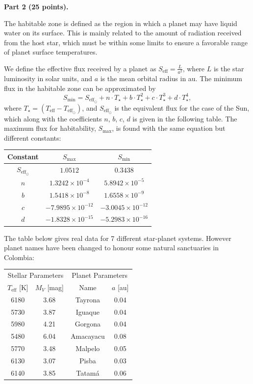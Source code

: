 \medskip
\noindent\textbf{Part 2 (25 points).}

The habitable zone is defined as the region in which a planet may have liquid
water on its surface. This is mainly related to the amount of radiation
received from the host star, which must be within some limits to ensure a
favorable range of planet surface temperatures.

We define the effective flux received by a planet as
$S_{\mathrm{eff}} = \frac{L}{a^2}$, where $L$ is the star luminosity in solar
units, and $a$ is the mean orbital radius in au. The minimum flux in the
habitable zone can be approximated by
\[
S_{\mathrm{min}} = S_{\mathrm{eff}_\odot} + n\cdot T_\star + b\cdot T_\star^2
  + c\cdot T_\star^3 + d\cdot T_\star^4,
\]
where $T_\star = (T_{\mathrm{eff}} - T_{\mathrm{eff}_\odot})$, and
$S_{\mathrm{eff}_\odot}$ is the equivalent flux for the case of the Sun, which
along with the coefficients $n$, $b$, $c$, $d$ is given in the following
table. The maximum flux for habitability, $S_{\mathrm{max}}$, is found with the
same equation but different constants:

\begin{center}
\begin{tabular}{ccc}
\toprule
Constant & $S_{\mathrm{max}}$ & $S_{\mathrm{min}}$\\
\midrule
$S_{\mathrm{eff}_\odot}$ & $1.0512$ & $0.3438$\\
$n$ & $1.3242\times10^{-4}$ & $5.8942\times10^{-5}$\\
$b$ & $1.5418\times10^{-8}$ & $1.6558\times10^{-9}$\\
$c$ & $-7.9895\times10^{-12}$ & $-3.0045\times10^{-12}$\\
$d$ & $-1.8328\times10^{-15}$ & $-5.2983\times10^{-16}$\\
\bottomrule
\end{tabular}
\end{center}

The table below gives real data for 7 different star-planet systems. However
planet names have been changed to honour some natural sanctuaries in Colombia:

\begin{center}
\begin{tabular}{cc cc}
\toprule
\multicolumn{2}{c}{Stellar Parameters} & \multicolumn{2}{c}{Planet Parameters}\\
$T_{\mathrm{eff}}$ [K] & $M_V$ [mag] & Name & $a$ [au]\\
\midrule
6180 & 3.68 & Tayrona   & 0.04\\
5730 & 3.87 & Iguaque   & 0.04\\
5980 & 4.21 & Gorgona   & 0.04\\
5480 & 6.04 & Amacayacu & 0.08\\
5770 & 3.48 & Malpelo   & 0.05\\
6130 & 3.07 & Pisba     & 0.03\\
6140 & 3.85 & Tatam\'a  & 0.06\\
\bottomrule
\end{tabular}
\end{center}

